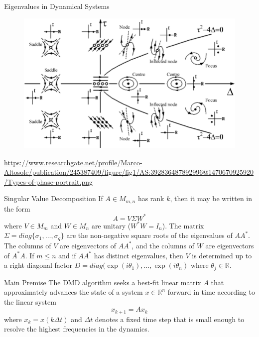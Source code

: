 \documentclass{beamer}
\begin{document}
	
	\begin{frame}{Eigenvalues in Dynamical Systems}
		\begin{figure}[h]
			\centering
				\includegraphics[scale=0.3]{../Figures/fig_phase_portrait.png}
		\end{figure}
		\url{https://www.researchgate.net/profile/Marco-Altosole/publication/245387409/figure/fig1/AS:392836487892996@1470670925920/Types-of-phase-portrait.png}		
	\end{frame}
	
	\begin{frame}{Singular Value Decomposition}
		If $A \in M_{m,n}$ has rank $k$, then it may be written in the form 
		\begin{equation*}
			A=V \Sigma W^*
		\end{equation*}
		where $V\in M_m$ and $W\in M_n$ are unitary ($W^* W=I_n$). The matrix $\Sigma=diag\{\sigma_1,\ldots, \sigma_q\}$ are the non-negative square roots of the eigenvalues of $AA^*$. The columns of $V$ are eigenvectors of $AA^*$, and the columns of $W$ are eigenvectors of $A^* A$. If $m\le n$ and if $AA^*$ has distinct eigenvalues, then $V$ is determined up to a right diagonal factor $D=diag( \exp(i\theta_1), \ldots, \exp(i \theta_n)$ where $\theta_j \in \mathbb{R}$. 
	\end{frame}
	
	\begin{frame}{Main Premise}
		The DMD algorithm seeks a best-fit linear matrix $A$ that approximately advances the state of a system $x\in \mathbb{R}^n$ forward in time according to the linear system
		\begin{equation*}
			x_{k+1}= A x_k
		\end{equation*}
		where $x_k= x(k\Delta t)$ and $\Delta t$ denotes a fixed time step that is small enough to resolve the highest frequencies in the dynamics.
	\end{frame}
	
\end{document}
